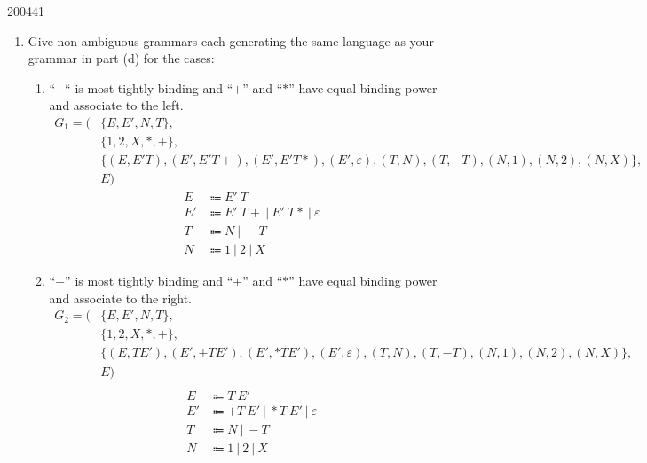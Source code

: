 \documentclass[10pt,\jkfside,a4paper]{article}
\begin{document}
\begin{examquestion}{2004}{4}{1}
\begin{enumerate}
\item Give non-ambiguous grammars each generating the same language as your
grammar in part (d) for the cases:

\begin{enumerate}

\item ``$-$`` is most tightly binding and ``$+$'' and ``$*$'' have equal
binding power and associate to the left.
\[
\begin{split}
G_1 = (&\{E, E', N, T\}, \\
	   &\{1, 2, X, *, +\}, \\
	   &\{(E, E'T), (E', E'T+), (E', E'T*), (E', \varepsilon), (T, N), (T,
	   -T), (N, 1), (N, 2), (N, X)\}, \\
	   &E)
\end{split}
\]
\begin{align*}
E  &\Coloneqq E' \ T \\
E' &\Coloneqq E' \ T+ \ | \ E' \ T* \ | \ \varepsilon \\
T  &\Coloneqq N \ | \ -T \\
N  &\Coloneqq 1 \ | \ 2 \ | \ X
\end{align*}

\item ``$-$'' is most tightly binding and ``$+$'' and ``$*$'' have equal
binding power and associate to the right.
\[
\begin{split}
G_2 = (&\{E, E', N, T\}, \\
	   &\{1, 2, X, *, +\}, \\
	   &\{(E, TE'), (E', +TE'), (E', *TE'), (E', \varepsilon), (T, N), (T,
	   -T), (N, 1), (N, 2), (N, X)\}, \\
	   &E) \\
\end{split}
\]
\begin{align*}
E  &\Coloneqq T \ E' \\
E' &\Coloneqq +T \ E' \ | \ *T \ E' \ | \ \varepsilon \\
T  &\Coloneqq N \ | \ -T \\
N  &\Coloneqq 1 \ | \ 2 \ | \ X
\end{align*}


\end{enumerate}
\end{enumerate}
\end{examquestion}
\end{document}
